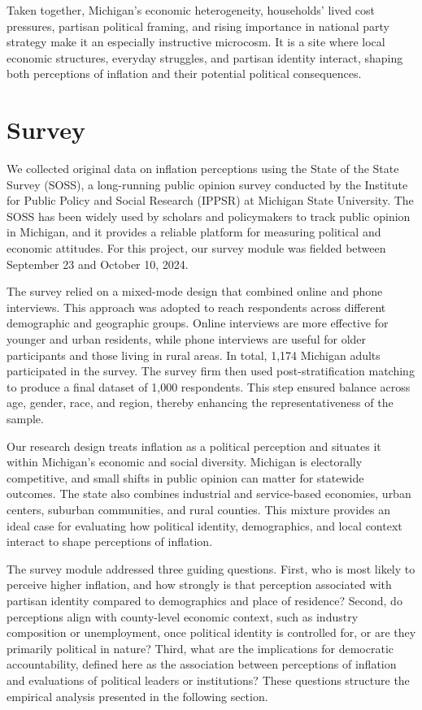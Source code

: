 \documentclass[preprint,12pt,authoryear]{elsarticle}
\begin{document}
Taken together, Michigan’s economic heterogeneity, households’ lived cost pressures, partisan political framing, and rising importance in national party strategy make it an especially instructive microcosm. It is a site where local economic structures, everyday struggles, and partisan identity interact, shaping both perceptions of inflation and their potential political consequences.


\section{Survey}

We collected original data on inflation perceptions using the State of the State Survey (SOSS), a long-running public opinion survey conducted by the Institute for Public Policy and Social Research (IPPSR) at Michigan State University. The SOSS has been widely used by scholars and policymakers to track public opinion in Michigan, and it provides a reliable platform for measuring political and economic attitudes. For this project, our survey module was fielded between September 23 and October 10, 2024.

The survey relied on a mixed-mode design that combined online and phone interviews. This approach was adopted to reach respondents across different demographic and geographic groups. Online interviews are more effective for younger and urban residents, while phone interviews are useful for older participants and those living in rural areas. In total, 1,174 Michigan adults participated in the survey. The survey firm then used post-stratification matching to produce a final dataset of 1,000 respondents. This step ensured balance across age, gender, race, and region, thereby enhancing the representativeness of the sample.

Our research design treats inflation as a political perception and situates it within Michigan’s economic and social diversity. Michigan is electorally competitive, and small shifts in public opinion can matter for statewide outcomes. The state also combines industrial and service-based economies, urban centers, suburban communities, and rural counties. This mixture provides an ideal case for evaluating how political identity, demographics, and local context interact to shape perceptions of inflation.

The survey module addressed three guiding questions. First, who is most likely to perceive higher inflation, and how strongly is that perception associated with partisan identity compared to demographics and place of residence? Second, do perceptions align with county-level economic context, such as industry composition or unemployment, once political identity is controlled for, or are they primarily political in nature? Third, what are the implications for democratic accountability, defined here as the association between perceptions of inflation and evaluations of political leaders or institutions? These questions structure the empirical analysis presented in the following section.
\end{document}

